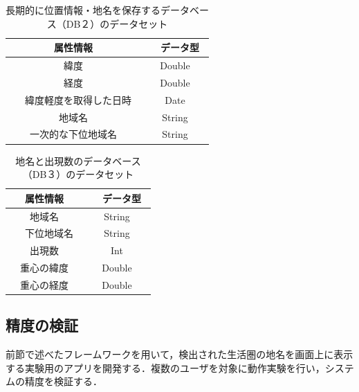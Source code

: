 \documentclass[a4paper]{jsarticle}
\begin{document}
\begin{table}[H]
  \begin{center}
    \caption{長期的に位置情報・地名を保存するデータベース（DB２）のデータセット}
    \renewcommand\arraystretch{1.4}
    \begin{tabular}{|c|c|}
      \hline
      \multicolumn{1}{|c}{属性情報} & \multicolumn{1}{|c|}{　データ型　} \\
      \hline
      \hline
      \multicolumn{1}{|c}{緯度} & \multicolumn{1}{|c|}{Double} \\
      \hline
      \multicolumn{1}{|c}{経度} & \multicolumn{1}{|c|}{Double} \\
      \hline
      　緯度軽度を取得した日時　 & Date \\
      \hline
      地域名 & String \\
      \hline
      一次的な下位地域名 & String \\
      \hline
    \end{tabular}
    \label{tab:livingarea-db-2}
  \end{center}
\end{table}

\begin{table}[H]
  \begin{center}
    \caption{地名と出現数のデータベース（DB３）のデータセット}
    \renewcommand\arraystretch{1.4}
    \begin{tabular}{|c|c|}
      \hline
      属性情報 & 　データ型　 \\
      \hline
      \hline
      地域名 & String \\
      \hline
      　下位地域名　 & String \\
      \hline
      出現数 & Int \\
      \hline
      重心の緯度 & Double \\
      \hline
      重心の経度 & Double \\
      \hline
    \end{tabular}
    \label{tab:livingarea-db-3}
  \end{center}
\end{table}

\subsection{精度の検証}
前節で述べたフレームワークを用いて，検出された生活圏の地名を画面上に表示する実験用のアプリを開発する．複数のユーザを対象に動作実験を行い，システムの精度を検証する．
\end{document}
